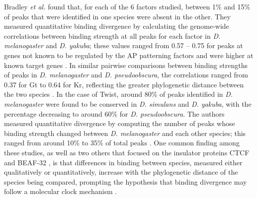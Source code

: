 Bradley \emph{et al.} found that, for each of the 6 factors studied, between 1\% and 15\% of peaks that were identified in one species were absent in the other. They measured quantitative binding divergence by calculating the genome-wide correlations between binding strength at all peaks for each factor in \emph{D. melanogaster} and \emph{D. yakuba}; these values ranged from 0.57 – 0.75 for peaks at genes not known to be regulated by the AP patterning factors and were higher at known target genes \citep{bradley_binding_2010}. In similar pairwise comparisons between binding strengths of peaks in \emph{D. melanogaster} and \emph{D. pseudoobscura}, the correlations ranged from 0.37 for Gt to 0.64 for Kr, reflecting the greater phylogenetic distance between the two species \citep{paris_extensive_2013}. In the case of Twist, around 80\% of peaks identified in \emph{D. melanogaster} were found to be conserved in \emph{D. simulans} and \emph{D. yakuba}, with the percentage decreasing to around 60\% for \emph{D. pseudoobscura}. The authors measured quantitative divergence by computing the number of peaks whose binding strength changed between \emph{D. melanogaster} and each other species; this ranged from around 10\% to 35\% of total peaks \citep{he_high_2011}. One common finding among these studies, as well as two others that focused on the insulator proteins CTCF and BEAF-32 \citep{ni_adaptive_2012,yang_beaf-32_2012}, is that differences in binding between species, measured either qualitatively or quantitatively, increase with the phylogenetic distance of the species being compared, prompting the hypothesis that binding divergence may follow a molecular clock mechanism \citep{he_high_2011}.\\

